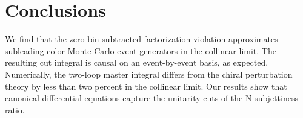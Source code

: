 \section{Conclusions}\label{sec:conclusions}

We find that the zero-bin-subtracted factorization violation
approximates subleading-color Monte Carlo event generators in the
collinear limit. The resulting cut integral is causal on an
event-by-event basis, as expected. Numerically, the two-loop master
integral differs from the chiral perturbation theory by less than two
percent in the collinear limit. Our results show that canonical
differential equations capture the unitarity cuts of the N-subjettiness
ratio.

